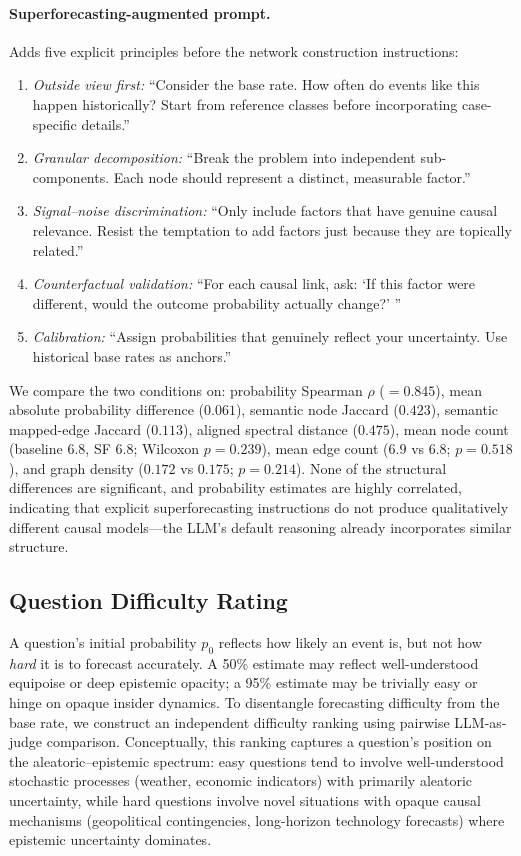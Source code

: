 \documentclass[11pt]{article}
\begin{document}
\paragraph{Superforecasting-augmented prompt.} Adds five explicit principles before the network construction instructions:
\begin{enumerate}
\small
\item \textit{Outside view first:} ``Consider the base rate. How often do events like this happen historically? Start from reference classes before incorporating case-specific details.''
\item \textit{Granular decomposition:} ``Break the problem into independent sub-components. Each node should represent a distinct, measurable factor.''
\item \textit{Signal--noise discrimination:} ``Only include factors that have genuine causal relevance. Resist the temptation to add factors just because they are topically related.''
\item \textit{Counterfactual validation:} ``For each causal link, ask: `If this factor were different, would the outcome probability actually change?' ''
\item \textit{Calibration:} ``Assign probabilities that genuinely reflect your uncertainty. Use historical base rates as anchors.''
\end{enumerate}

We compare the two conditions on: probability Spearman $\rho$ ($= 0.845$), mean absolute probability difference ($0.061$), semantic node Jaccard ($0.423$), semantic mapped-edge Jaccard ($0.113$), aligned spectral distance ($0.475$), mean node count (baseline $6.8$, SF $6.8$; Wilcoxon $p = 0.239$), mean edge count ($6.9$ vs $6.8$; $p = 0.518$), and graph density ($0.172$ vs $0.175$; $p = 0.214$). None of the structural differences are significant, and probability estimates are highly correlated, indicating that explicit superforecasting instructions do not produce qualitatively different causal models---the LLM's default reasoning already incorporates similar structure.

\subsection{Question Difficulty Rating}
\label{app:difficulty}

A question's initial probability $p_0$ reflects how likely an event is, but not how \emph{hard} it is to forecast accurately.
A 50\% estimate may reflect well-understood equipoise or deep epistemic opacity; a 95\% estimate may be trivially easy or hinge on opaque insider dynamics.
To disentangle forecasting difficulty from the base rate, we construct an independent difficulty ranking using pairwise LLM-as-judge comparison.
Conceptually, this ranking captures a question's position on the aleatoric--epistemic spectrum: easy questions tend to involve well-understood stochastic processes (weather, economic indicators) with primarily aleatoric uncertainty, while hard questions involve novel situations with opaque causal mechanisms (geopolitical contingencies, long-horizon technology forecasts) where epistemic uncertainty dominates.
\end{document}
